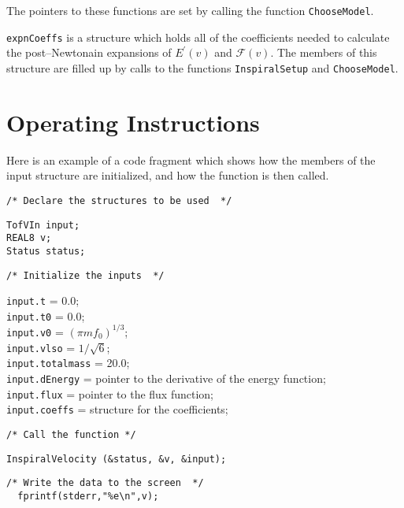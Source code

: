 \documentclass[12pt]{article}
\begin{document}
\vspace{5mm}

The pointers to these functions are set by calling the function \texttt{ChooseModel}.

\texttt{expnCoeffs} is a structure which holds all of the coefficients needed to calculate the post--Newtonain expansions of $E^{\prime}(v)$ and $\mathcal{F}(v)$. The members of this structure are filled up by calls to the functions \texttt{InspiralSetup} and \texttt{ChooseModel}.









\section{Operating Instructions}

Here is an example of a code fragment which shows how the members of the input structure are initialized, and how the function is then called.

\vspace{5mm}

\noindent
\begin{verbatim}
/* Declare the structures to be used  */
\end{verbatim}
\texttt{TofVIn input;} \\
\texttt{REAL8 v;} \\
\texttt{Status status;} \\
\begin{verbatim}
/* Initialize the inputs  */
\end{verbatim}
\texttt{input.t} = 0.0; \\
\texttt{input.t0} = 0.0; \\
\texttt{input.v0} = $(\pi m f_{0})^{1/3}$; \\
\texttt{input.vlso} = $1/\sqrt{6}$; \\
\texttt{input.totalmass} = 20.0; \\
\texttt{input.dEnergy} = pointer to the derivative of the energy function; \\
\texttt{input.flux} = pointer to the flux function; \\
\texttt{input.coeffs} = structure for the coefficients; \\
\begin{verbatim}
/* Call the function */
\end{verbatim}
\texttt{InspiralVelocity (\&status, \&v, \&input);}
\begin{verbatim}
/* Write the data to the screen  */
  fprintf(stderr,"%e\n",v); 
\end{verbatim}
\end{document}
